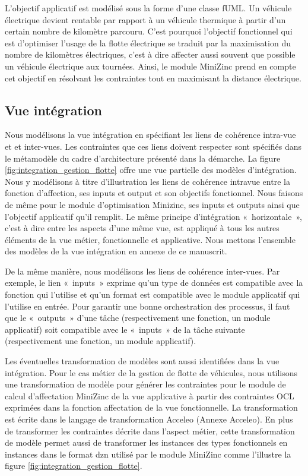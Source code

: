 L'objectif applicatif est modélisé sous la forme d'une classe fUML. Un véhicule électrique devient rentable par rapport à un véhicule thermique à partir d'un certain nombre de kilomètre parcouru. C'est pourquoi l'objectif fonctionnel qui est d'optimiser l'usage de la flotte électrique se traduit par la maximisation du nombre de kilomètres électriques, c'est à dire affecter aussi souvent que possible un véhicule électrique aux tournées. Ainsi, le module MiniZinc prend en compte cet objectif en résolvant les contraintes tout en maximisant la distance électrique. 

\subsection{Vue intégration}

Nous modélisons la vue intégration en spécifiant les liens de cohérence  intra-vue et et inter-vues. Les contraintes que ces liens doivent respecter sont spécifiés dans le métamodèle du cadre d'architecture présenté dans la démarche. La figure \ref{fig:integration_gestion_flotte} offre une vue partielle des modèles d'intégration. Nous y modélisons à titre d'illustration les liens de cohérence intravue entre la fonction d'affection, ses inputs et output et son objectifs fonctionnel. Nous faisons de même pour le module d'optimisation Minizinc, ses inputs et outputs ainsi que l'objectif applicatif qu'il remplit. Le même principe d'intégration «~horizontale~», c'est à dire entre les aspects d'une même vue, est appliqué à tous les autres éléments de la vue métier, fonctionnelle et applicative. Nous mettons l'ensemble des modèles de la vue intégration en annexe de ce manuscrit. 

De la même manière, nous modélisons les liens de cohérence inter-vues. Par exemple, le lien «~inputs~» exprime qu'un type de données est compatible avec la fonction qui l'utilise et qu'un format est compatible avec le module applicatif qui l'utilise en entrée. Pour garantir une bonne orchestration des processus, il faut que le «~outputs~» d'une tâche (respectivement une fonction, un module applicatif) soit compatible avec le «~inputs~» de la tâche suivante (respectivement une fonction, un module applicatif).

Les éventuelles transformation de modèles sont aussi identifiées dans la vue intégration. Pour le cas métier de la gestion de flotte de véhicules, nous utilisons une transformation de modèle pour générer les contraintes pour le module de calcul d'affectation MiniZinc de la vue applicative à partir des contraintes OCL exprimées dans la fonction affectation de la vue fonctionnelle. La transformation est écrite dans le langage de transformation Acceleo (Annexe Acceleo). En plus de transformer les contraintes décrite dans l'aspect métier, cette transformation de modèle permet aussi de transformer les instances des types fonctionnels en instances dans le format dzn utilisé par le module MiniZinc comme l'illustre la figure \ref{fig:integration_gestion_flotte}. 

